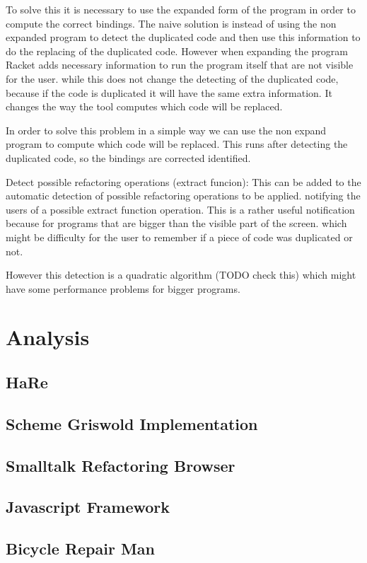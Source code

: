 To solve this it is necessary to use the expanded form of the program in order
to compute the correct bindings. The naive solution is instead of using the
non expanded program to detect the duplicated code and then use this information
to do the replacing of the duplicated code. However when expanding the program
Racket adds necessary information to run the program itself that are not visible
for the user. while this does not change the detecting of the duplicated code,
because if the code is duplicated it will have the same extra information. It changes
the way the tool computes which code will be replaced.

In order to solve this problem in a simple way we can use the non expand program
to compute which code will be replaced. This runs after detecting the duplicated
code, so the bindings are corrected identified.

Detect possible refactoring operations (extract funcion):
This can be added to the automatic detection of possible refactoring operations
to be applied. notifying the users of a possible extract function operation.
This is a rather useful notification because for programs that are bigger than the
visible part of the screen. which might be difficulty for the user to remember
if a piece of code was duplicated or not.

However this detection is a quadratic algorithm (TODO check this) which might
have some performance problems for bigger programs.

\section{Analysis}
\subsection{HaRe}
\subsection{Scheme Griswold Implementation}
\subsection{Smalltalk Refactoring Browser}
\subsection{Javascript Framework}
\subsection{Bicycle Repair Man}
